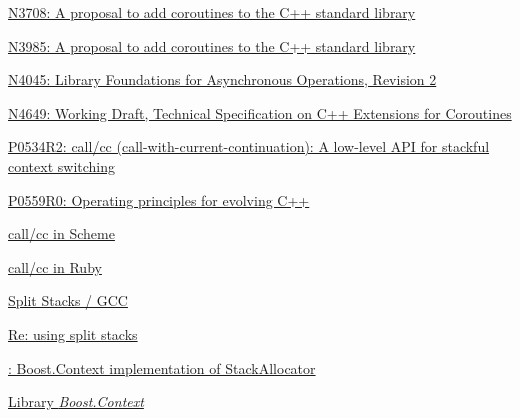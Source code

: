 \newpage
{}
\begin{thebibliography}{99}

        \href{http://www.open-std.org/jtc1/sc22/wg21/docs/papers/2013/n3708.pdf}
        {N3708: A proposal to add coroutines to the C++ standard library}

        \href{http://www.open-std.org/jtc1/sc22/wg21/docs/papers/2013/n3985.pdf}
        {N3985: A proposal to add coroutines to the C++ standard library}

        \href{http://www.open-std.org/jtc1/sc22/wg21/docs/papers/2014/n4045.pdf}
        {N4045: Library Foundations for Asynchronous Operations, Revision 2}

        \href{http://www.open-std.org/jtc1/sc22/wg21/docs/papers/2017/n4649.pdf}
        {N4649: Working Draft, Technical Specification on C++ Extensions for Coroutines}

        \href{http://www.open-std.org/jtc1/sc22/wg21/docs/papers/2017/p0534r2.pdf}
        {P0534R2: call/cc (call-with-current-continuation): A low-level API for stackful
        context switching}

        \href{http://www.open-std.org/jtc1/sc22/wg21/docs/papers/2017/p0559r0.pdf}
        {P0559R0: Operating principles for evolving C++}

        \href{http://community.schemewiki.org/?call-with-current-continuation}
        {call/cc in Scheme}

        \href{http://gnuu.org/2009/03/21/demystifying-continuations-in-ruby}
        {call/cc in Ruby}

        \href{http://gcc.gnu.org/wiki/SplitStacks}
        {Split Stacks / GCC}

        \href{https://gcc.gnu.org/ml/gcc-help/2012-03/msg00395.html}
        {Re: using split stacks}

        \href{https://github.com/boostorg/context/blob/master/include/boost/context/posix/segmented_stack.hpp}
        {: Boost.Context implementation
        of  StackAllocator}

        \href{http://www.boost.org/doc/libs/release/libs/context/doc/html/index.html}
        {Library \emph{Boost.Context}}


\end{thebibliography}
